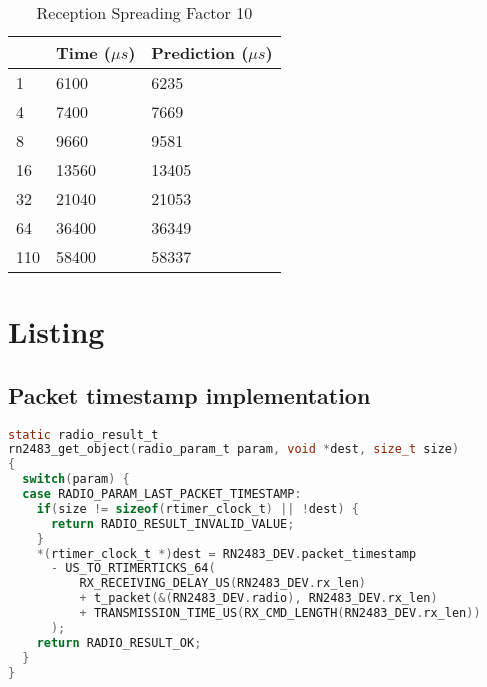 \begin{table}[H]
\centering
\begin{tabular}{|l|l|l|}
\hline
\rowcolor[HTML]{C0C0C0}
\multicolumn{1}{|c|}{\cellcolor[HTML]{C0C0C0}Bytes} & Time ($\mu s$) & Prediction ($\mu s$) \\ \hline
1                                                   & 6100      & 6235       \\ \hline
4                                                   & 7400      & 7669       \\ \hline
8                                                   & 9660      & 9581       \\ \hline
16                                                  & 13560     & 13405      \\ \hline
32                                                  & 21040     & 21053      \\ \hline
64                                                  & 36400     & 36349      \\ \hline
110                                                 & 58400     & 58337      \\ \hline
\end{tabular}
\caption{Reception Spreading Factor 10\label{table:rxsf10}}
\end{table}

\chapter{Listing}

\section{Packet timestamp implementation\label{code:timestampimpl}}

\begin{lstlisting}[language=c]
static radio_result_t
rn2483_get_object(radio_param_t param, void *dest, size_t size)
{
  switch(param) {
  case RADIO_PARAM_LAST_PACKET_TIMESTAMP:
    if(size != sizeof(rtimer_clock_t) || !dest) {
      return RADIO_RESULT_INVALID_VALUE;
    }
    *(rtimer_clock_t *)dest = RN2483_DEV.packet_timestamp
      - US_TO_RTIMERTICKS_64(
          RX_RECEIVING_DELAY_US(RN2483_DEV.rx_len)
          + t_packet(&(RN2483_DEV.radio), RN2483_DEV.rx_len)
          + TRANSMISSION_TIME_US(RX_CMD_LENGTH(RN2483_DEV.rx_len))
      );
    return RADIO_RESULT_OK;
  }
}
\end{lstlisting}



